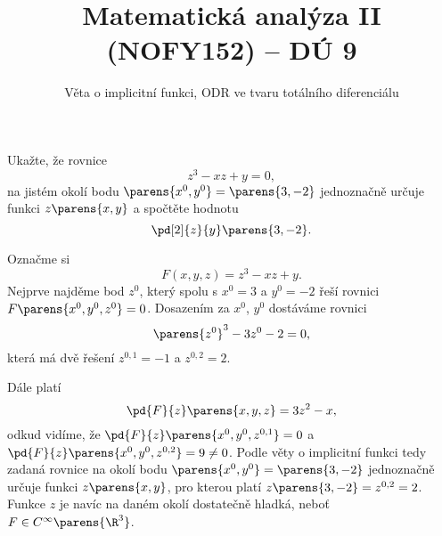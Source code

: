 \documentclass[answers]{exam}
\title{\vspace{-3ex}Matematická analýza II (NOFY152) – DÚ 9}
\author{Věta o implicitní funkci, ODR ve tvaru totálního diferenciálu}
\date{\vspace{-5ex}}
\begin{document}
\maketitle

\begin{questions}	
	\question
		Ukažte, že rovnice
		\begin{equation*}
			z^3 - xz + y = 0,
		\end{equation*}
		na jistém okolí bodu $\parens{x^0, y^0} = \parens{3, -2}$ jednoznačně určuje funkci $z\parens{x, y}$ a spočtěte hodnotu
		\begin{equation*}
			\pd[2]{z}{y}\parens{3, -2}.
		\end{equation*}
		
	\begin{solution}
		Označme si
		\begin{equation*}
			F(x, y, z) = z^3 - xz + y.
		\end{equation*}
		Nejprve najděme bod $z^0$, který spolu s $x^0 = 3$ a $y^0 = -2$ řeší rovnici $F\parens{x^0, y^0, z^0} = 0$. Dosazením za $x^0$, $y^0$ dostáváme rovnici
		\begin{equation*}
			\parens{z^0}^3 -3z^0 - 2 = 0,
		\end{equation*}
		která má dvě řešení $z^{0,1} = -1$ a $z^{0,2} = 2$.
		
		Dále platí
		\begin{equation*}
			\pd{F}{z}\parens{x, y, z} = 3z^2 - x,
		\end{equation*}
		odkud vidíme, že $\pd{F}{z}\parens{x^0, y^0, z^{0,1}} = 0$ a $\pd{F}{z}\parens{x^0, y^0, z^{0,2}} = 9 \neq 0$. Podle věty o implicitní funkci tedy zadaná rovnice na okolí bodu $\parens{x^0, y^0} = \parens{3, -2}$ jednoznačně určuje funkci $z\parens{x,y}$, pro kterou platí $z\parens{3, -2} = z^{0,2} = 2$. Funkce $z$ je navíc na daném okolí dostatečně hladká, neboť $F \in C^{\infty}\parens{\R^3}$.
		

\end{solution}
\end{questions}
\end{document}
